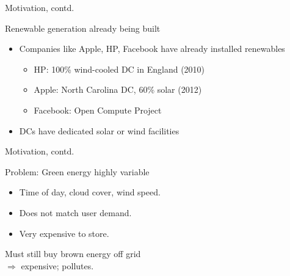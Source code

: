 \documentclass[xcolor=dvipsnames]{beamer}
\begin{document}
\begin{frame}{Motivation, contd.}
	\begin{block}{Renewable generation already being built}
		\begin{itemize}
			\item Companies like Apple, HP, Facebook have already installed renewables
			\begin{itemize}
				\item HP: 100\% wind-cooled DC in England (2010)
				\item Apple: North Carolina DC, 60\% solar (2012)
				\item Facebook: Open Compute Project
			\end{itemize}
			\item DCs have dedicated solar or wind facilities
		\end{itemize}
	\end{block}
\end{frame}

\begin{frame}{Motivation, contd.}

	\begin{block}{Problem: Green energy highly variable} 
		\begin{itemize}
			 \item{Time of day, cloud cover, wind speed.}
			 \item{Does not match user demand. }
			\item{Very expensive to store.}
		\end{itemize}
		Must still buy brown energy off grid \\ $\Rightarrow$ expensive; pollutes.
	\end{block}
\end{frame}
\end{document}
